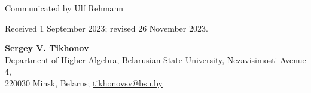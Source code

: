 \documentclass[10pt]{article}
\theoremstyle{definition}
\begin{document}
\bigskip\noindent Communicated by Ulf Rehmann

\noindent Received 1 September 2023; revised 26 November 2023.
\bigskip

\noindent\textbf{Sergey V. Tikhonov}\\
Department of Higher Algebra, Belarusian State University, Nezavisimosti Avenue 4,\\
220030 Minsk, Belarus; \href{mailto:tikhonovsv@bsu.by}{tikhonovsv@bsu.by}
\end{document}
